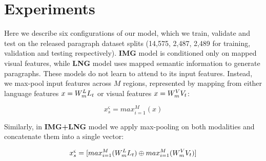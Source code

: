 \documentclass[11pt,a4paper]{article}
\begin{document}

\section{Experiments}



Here we describe six configurations of our model, which we train, validate and test on the released paragraph dataset splits (14,575, 2,487, 2,489 for training, validation and testing respectively).
\textbf{IMG} model is conditioned only on mapped visual features, while \textbf{LNG} model uses mapped semantic information to generate paragraphs.
These models do not learn to attend to its input features.
Instead, we max-pool input features across $M$ regions, represented by mapping from either language features $x=W_{m}\sp{L} L_t$ or visual features $x=W_{m}\sp{V} V_t$:

\begin{equation}
  x^\varsigma_s = max_{i=1}^M(x)
  \label{eqn:maxpool}
\end{equation}

Similarly, in \textbf{IMG+LNG} model we apply max-pooling on both modalities and concatenate them into a single vector:

\begin{equation}
  x^\varsigma_s = [max_{i=1}^M(W_{m}\sp{L} L_t) \oplus max_{i=1}^M(W_{m}\sp{V} V_t)]
  \label{eqn:maxpool}
\end{equation}
\end{document}
